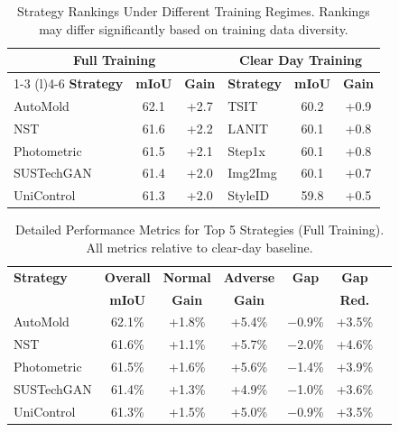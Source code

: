 
\begin{table}[t]
\centering
\caption{Strategy Rankings Under Different Training Regimes. Rankings may differ significantly based on training data diversity.}
\label{tab:leaderboard_comparison}
\begin{tabular}{@{}lcclcc@{}}
\toprule
\multicolumn{3}{c}{\textbf{Full Training}} & \multicolumn{3}{c}{\textbf{Clear Day Training}} \\
\cmidrule(r){1-3} \cmidrule(l){4-6}
\textbf{Strategy} & \textbf{mIoU} & \textbf{Gain} & \textbf{Strategy} & \textbf{mIoU} & \textbf{Gain} \\
\midrule
AutoMold & 62.1 & +2.7 & TSIT & 60.2 & +0.9 \\
NST & 61.6 & +2.2 & LANIT & 60.1 & +0.8 \\
Photometric & 61.5 & +2.1 & Step1x & 60.1 & +0.8 \\
SUSTechGAN & 61.4 & +2.0 & Img2Img & 60.1 & +0.7 \\
UniControl & 61.3 & +2.0 & StyleID & 59.8 & +0.5 \\
\bottomrule
\end{tabular}
\end{table}



\begin{table}[t]
\centering
\caption{Detailed Performance Metrics for Top 5 Strategies (Full Training). All metrics relative to clear-day baseline.}
\label{tab:top5_detailed}
\begin{tabular}{@{}lcccccc@{}}
\toprule
\textbf{Strategy} & \textbf{Overall} & \textbf{Normal} & \textbf{Adverse} & \textbf{Gap} & \textbf{Gap} \\
 & \textbf{mIoU} & \textbf{Gain} & \textbf{Gain} & & \textbf{Red.} \\
\midrule
AutoMold & 62.1\% & +1.8\% & +5.4\% & $-$0.9\% & +3.5\% \\
NST & 61.6\% & +1.1\% & +5.7\% & $-$2.0\% & +4.6\% \\
Photometric & 61.5\% & +1.6\% & +5.6\% & $-$1.4\% & +3.9\% \\
SUSTechGAN & 61.4\% & +1.3\% & +4.9\% & $-$1.0\% & +3.6\% \\
UniControl & 61.3\% & +1.5\% & +5.0\% & $-$0.9\% & +3.5\% \\
\bottomrule
\end{tabular}
\end{table}


